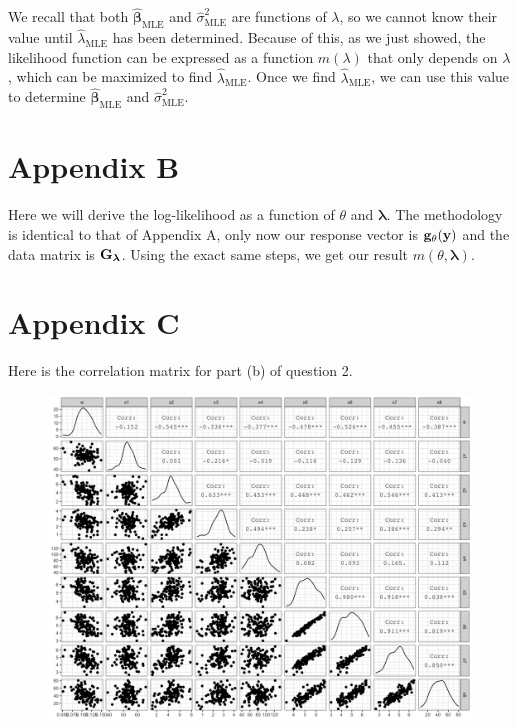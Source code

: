 \documentclass[10pt]{article}
\begin{document}
We recall that both \(\hat{\bm{\beta}}_{\mathrm{MLE}}\) and \(\hat{\sigma}^2_{\mathrm{MLE}}\) are functions of \(\lambda\), so we cannot know their value until \(\hat{\lambda}_{\mathrm{MLE}}\) has been determined.
Because of this, as we just showed, the likelihood function can be expressed as a function \(m(\lambda)\) that only depends on \(\lambda\), which can be maximized to find \(\hat{\lambda}_{\mathrm{MLE}}\). 
Once we find \(\hat{\lambda}_{\mathrm{MLE}}\), we can use this value to determine \(\hat{\bm{\beta}}_{\mathrm{MLE}}\) and \(\hat{\sigma}^2_{\mathrm{MLE}}\). 


\section{Appendix B} \noindent
Here we will derive the log-likelihood as a function of \(\theta\) and \(\bm{\lambda}\).
The methodology is identical to that of Appendix A, only now our response vector is \(\mathbf{g}_{\theta}(\mathbf{y})\) and the data matrix is \(\mathbf{G}_{\bm{\lambda}}\). 
Using the exact same steps, we get our result \(m(\theta, \bm{\lambda})\).


\section{Appendix C} \noindent
Here is the correlation matrix for part (b) of question 2. 

\begin{figure}[ht]
    \centering
    \includegraphics[width = \textwidth]{img/q02-correlation-matrix.png}
\end{figure}
\end{document}
